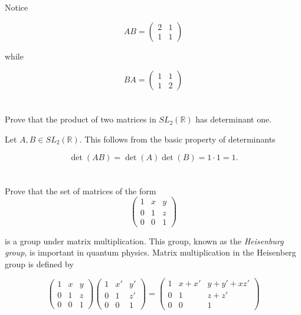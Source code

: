 \documentclass[a4paper]{article}
\begin{document}
Notice

$$AB =   
  \begin{pmatrix}
    2 & 1 \\
    1 & 1
  \end{pmatrix}
$$

while 

$$BA = 
  \begin{pmatrix}
    1 & 1 \\
    1 & 2
  \end{pmatrix}
$$

\section{}

Prove that the product of two matrices in $SL_2(\mathbb{R})$ has determinant one.

\vspace{\baselineskip}

Let $A,B \in SL_2(\mathbb{R})$. This follows from the basic property of determinants

$$\det (AB) = \det(A) \det(B) = 1 \cdot 1 = 1.$$

\section{}

Prove that the set of matrices of the form
$$
  \begin{pmatrix}
    1 & x & y \\
    0 & 1 & z \\
    0 & 0 & 1
  \end{pmatrix}
$$

is a group under matrix multiplication. This group, known as the \textit{Heisenburg group}, is important in quantum physics. Matrix multiplication in the Heisenberg group is defined by

$$
  \begin{pmatrix}
    1 & x & y \\
    0 & 1 & z \\
    0 & 0 & 1
  \end{pmatrix}
  \begin{pmatrix}
    1 & x' & y' \\
    0 & 1 & z' \\
    0 & 0 & 1
  \end{pmatrix}
=
  \begin{pmatrix}
    1 & x + x' & y + y'+ xz' \\
    0 & 1 & z + z' \\
    0 & 0 & 1
  \end{pmatrix}
$$
\end{document}
